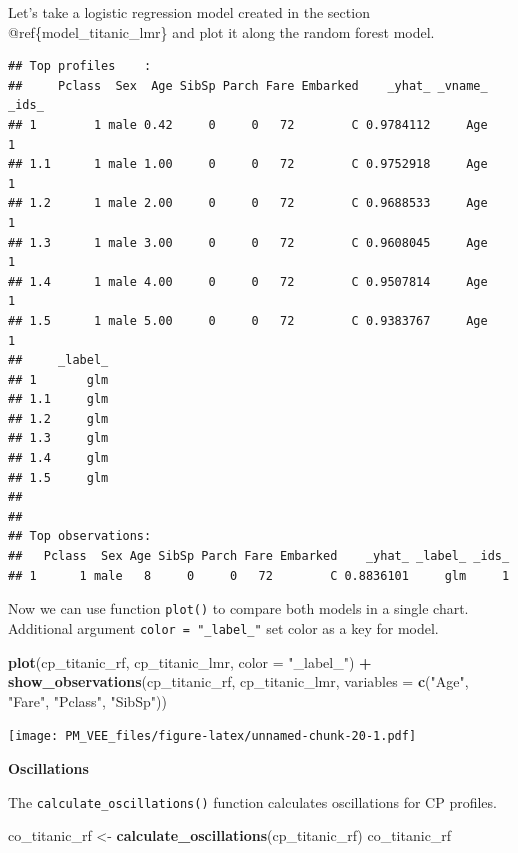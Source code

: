 \documentclass[]{krantz}
\newenvironment{Shaded}{\begin{snugshade}}{\end{snugshade}}
\newcommand{\DataTypeTok}[1]{\textcolor[rgb]{0.13,0.29,0.53}{#1}}
\newcommand{\KeywordTok}[1]{\textcolor[rgb]{0.13,0.29,0.53}{\textbf{#1}}}
\newcommand{\NormalTok}[1]{#1}
\newcommand{\OperatorTok}[1]{\textcolor[rgb]{0.81,0.36,0.00}{\textbf{#1}}}
\newcommand{\StringTok}[1]{\textcolor[rgb]{0.31,0.60,0.02}{#1}}
\theoremstyle{definition}
\theoremstyle{definition}
\theoremstyle{definition}
\theoremstyle{remark}
\begin{document}
Let's take a logistic regression model created in the section
@ref\{model\_titanic\_lmr\} and plot it along the random forest model.

\begin{verbatim}
## Top profiles    : 
##     Pclass  Sex  Age SibSp Parch Fare Embarked    _yhat_ _vname_ _ids_
## 1        1 male 0.42     0     0   72        C 0.9784112     Age     1
## 1.1      1 male 1.00     0     0   72        C 0.9752918     Age     1
## 1.2      1 male 2.00     0     0   72        C 0.9688533     Age     1
## 1.3      1 male 3.00     0     0   72        C 0.9608045     Age     1
## 1.4      1 male 4.00     0     0   72        C 0.9507814     Age     1
## 1.5      1 male 5.00     0     0   72        C 0.9383767     Age     1
##     _label_
## 1       glm
## 1.1     glm
## 1.2     glm
## 1.3     glm
## 1.4     glm
## 1.5     glm
## 
## 
## Top observations:
##   Pclass  Sex Age SibSp Parch Fare Embarked    _yhat_ _label_ _ids_
## 1      1 male   8     0     0   72        C 0.8836101     glm     1
\end{verbatim}

Now we can use function \texttt{plot()} to compare both models in a
single chart. Additional argument \texttt{color\ =\ "\_label\_"} set
color as a key for model.

\begin{Shaded}
\begin{Highlighting}[]
\KeywordTok{plot}\NormalTok{(cp_titanic_rf, cp_titanic_lmr, }\DataTypeTok{color =} \StringTok{"_label_"}\NormalTok{) }\OperatorTok{+}
\StringTok{  }\KeywordTok{show_observations}\NormalTok{(cp_titanic_rf, cp_titanic_lmr,}
        \DataTypeTok{variables =} \KeywordTok{c}\NormalTok{(}\StringTok{"Age"}\NormalTok{, }\StringTok{"Fare"}\NormalTok{, }\StringTok{"Pclass"}\NormalTok{, }\StringTok{"SibSp"}\NormalTok{)) }
\end{Highlighting}
\end{Shaded}

\texttt{[image: PM\_VEE\_files/figure-latex/unnamed-chunk-20-1.pdf]}

\textbf{Oscillations}

The \texttt{calculate\_oscillations()} function calculates oscillations
for CP profiles.

\begin{Shaded}
\begin{Highlighting}[]
\NormalTok{co_titanic_rf <-}\StringTok{ }\KeywordTok{calculate_oscillations}\NormalTok{(cp_titanic_rf)}
\NormalTok{co_titanic_rf}
\end{Highlighting}
\end{Shaded}
\end{document}
